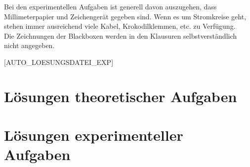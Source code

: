 Bei den experimentellen Aufgaben ist generell davon auszugehen, dass Millimeterpapier und Zeichengerät gegeben sind. Wenn es um Stromkreise geht, stehen immer ausreichend viele Kabel, Krokodilklemmen, etc. zu Verfügung.\\
Die Zeichnungen der Blackboxen werden in den Klausuren selbstverständlich nicht angegeben.

[AUTO_LOESUNGSDATEI_EXP]






\chapter{Lösungen theoretischer Aufgaben}


\chapter{Lösungen experimenteller Aufgaben}



\endinput
